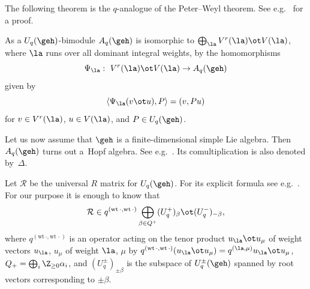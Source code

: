 The following theorem is the $q$-analogue of the Peter--Weyl theorem.
See e.g.~\cite{Kas93}  for a proof.

\begin{theorem}\label{th:peter}
As a $U_q(\geh)$-bimodule $A_q(\geh)$ is isomorphic to $\bigoplus_\la V^r(\la)\ot V(\la)$, where $\la$ runs
over all dominant integral weights, by the homomorphisms
\[
\Psi_\la: \ V^r(\la)\ot V(\la)\rightarrow A_q(\geh)
\]
given by
\[
\langle \Psi_\la(v\ot u),P\rangle = (v,Pu)
\]
for $v\in V^r(\la)$, $u\in V(\la)$, and $P\in U_q(\geh)$.
\end{theorem}

Let us now assume that $\geh$ is a f\/inite-dimensional simple Lie algebra. Then $A_q(\geh)$ turns out
a~Hopf algebra. See e.g.~\cite[Chapter~9]{Joseph}. Its comultiplication is also denoted by~$\Delta$.

Let $\mathcal{R}$ be the
universal $R$ matrix for $U_q(\geh)$. For its explicit formula see e.g.~\cite[p.~273]{CPbook}. For our purpose
it is enough to know that
\begin{gather}\label{eq:univR}
\mathcal{R}\in q^{(\text{wt}\,\cdot,\text{wt}\,\cdot)}
\bigoplus_{\beta\in Q^+}(U_q^+)_\beta\ot(U_q^-)_{-\beta},
\end{gather}
where $q^{(\text{wt}\,\cdot,\text{wt}\,\cdot)}$ is an operator acting on
the tenor product $u_\la\ot u_\mu$ of weight vectors $u_\la$, $u_\mu$ of weight $\la$, $\mu$ by
$q^{(\text{wt}\,\cdot,\text{wt}\,\cdot)}(u_\la\ot u_\mu)=q^{(\la,\mu)}
u_\la\ot u_\mu$, $Q_+=\bigoplus_i\Z_{\ge0}\alpha_i$, and $(U_q^\pm)_{\pm\beta}$ is the subspace of
$U_q^\pm(\geh)$ spanned by root vectors corresponding to $\pm\beta$.

